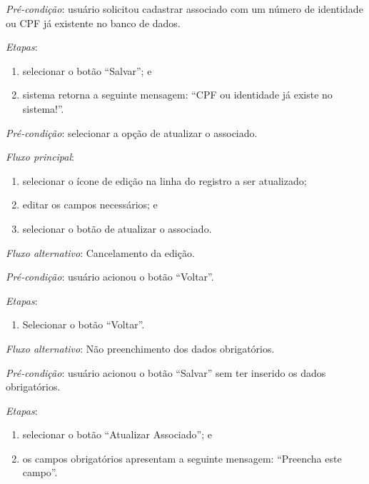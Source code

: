 \documentclass[a4paper,12pt]{article}
\begin{document}
\noindent \textit{Pré-condição}: usuário solicitou cadastrar associado com um número de identidade ou CPF já existente no banco de dados.

\noindent \textit{Etapas}:

\begin{enumerate}
    \item selecionar o botão ``Salvar''; e
    \item sistema retorna a seguinte mensagem: ``CPF ou identidade já existe no sistema!''.
\end{enumerate}


\vspace{0.7cm}

\noindent \textit{Pré-condição}: selecionar a opção de atualizar o associado.

\noindent \textit{Fluxo principal}:

\begin{enumerate}
    \item selecionar o ícone de edição na linha do registro a ser atualizado;
    \item editar os campos necessários; e
    \item selecionar o botão de atualizar o associado.
\end{enumerate}

\noindent \textit{Fluxo alternativo}: Cancelamento da edição.

\noindent \textit{Pré-condição}: usuário acionou o botão ``Voltar''.

\noindent \textit{Etapas}:

\begin{enumerate}
    \item Selecionar o botão ``Voltar''.
\end{enumerate}

\noindent \textit{Fluxo alternativo}: Não preenchimento dos dados obrigatórios.

\noindent \textit{Pré-condição}: usuário acionou o botão ``Salvar'' sem ter inserido os dados obrigatórios.

\noindent \textit{Etapas}:

\begin{enumerate}
    \item selecionar o botão ``Atualizar Associado''; e
    \item os campos obrigatórios apresentam a seguinte mensagem: ``Preencha este campo''.
\end{enumerate}
\end{document}
